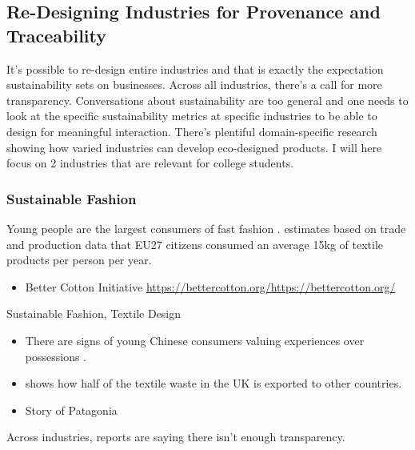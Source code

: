 \documentclass[
  letterpaper,
  DIV=11,
  numbers=noendperiod]{scrartcl}
\providecommand{\tightlist}{%
  \setlength{\itemsep}{0pt}\setlength{\parskip}{0pt}}\usepackage{longtable,booktabs,array}
\begin{document}
\subsection{Re-Designing Industries for Provenance and
Traceability}\label{re-designing-industries-for-provenance-and-traceability}

It's possible to re-design entire industries and that is exactly the
expectation sustainability sets on businesses. Across all industries,
there's a call for more transparency. Conversations about sustainability
are too general and one needs to look at the specific sustainability
metrics at specific industries to be able to design for meaningful
interaction. There's plentiful domain-specific research showing how
varied industries can develop eco-designed products. I will here focus
on 2 industries that are relevant for college students.

\subsubsection{Sustainable Fashion}\label{sustainable-fashion}

Young people are the largest consumers of fast fashion
\citep{YoungConsumersComplicated}. \citep[In][ European Environment
Agency (EEA)]{europeanenvironmentagencyTextilesEnvironmentRole2022}
estimates based on trade and production data that EU27 citizens consumed
an average 15kg of textile products per person per year.

\begin{itemize}
\tightlist
\item
  Better Cotton Initiative
  \href{https://bettercotton.org/}{https://bettercotton.org/https://bettercotton.org/}
\end{itemize}

Sustainable Fashion, Textile Design

\begin{itemize}
\item
  There are signs of young Chinese consumers valuing experiences over
  possessions \citep{jiangHowHaveCovid2023}.
\item
  \citet{millward-hopkinsMaterialFlowAnalysis2023} shows how half of the
  textile waste in the UK is exported to other countries.
\item
  Story of Patagonia \citet{chouinardLetMyPeople2005}
\end{itemize}

Across industries, reports are saying there isn't enough transparency.
\end{document}
